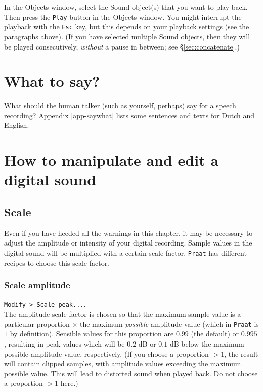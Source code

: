 \documentclass[
]{book}
\begin{document}
\label{box-praatplay}
In the Objects window, select the Sound object(s) that you want to play back. Then press the \texttt{Play} button in the Objects window. You might interrupt the playback with the \texttt{Esc} key, but this depends on your playback settings (see the paragraphs above). (If you have selected multiple Sound objects, then they will be played consecutively, \emph{without} a pause in between; see §\ref{sec:concatenate}.)

\section{What to say?}\label{sec:whattosay}

What should the human talker (such as yourself, perhaps) say for a speech recording? Appendix \ref{app-saywhat} lists some sentences and texts for Dutch and English.

\section{How to manipulate and edit a digital sound}\label{how-to-manipulate-and-edit-a-digital-sound}

\subsection{Scale}\label{scale}

Even if you have heeded all the warnings in this chapter, it may be necessary to adjust the amplitude or intensity of your digital recording. Sample values in the digital sound will be multiplied with a certain scale factor. \texttt{Praat} has different recipes to choose this scale factor.

\label{box-praatscale}
\subsubsection{Scale amplitude}\label{scale-amplitude}

\texttt{Modify\ \textgreater{}\ Scale\ peak...}.\\
The amplitude scale factor is chosen so that the maximum sample value is a particular proportion \(\times\) the maximum \emph{possible} amplitude value (which in \texttt{Praat} is \(1\) by definition). Sensible values for this proportion are \(0.99\) (the default) or \(0.995\), resulting in peak values which will be \(0.2\) dB or \(0.1\) dB below the maximum possible amplitude value, respectively. (If you choose a proportion \(>1\), the result will contain clipped samples, with amplitude values exceeding the maximum possible value. This will lead to distorted sound when played back. Do not choose a proportion \(>1\) here.)
\end{document}
